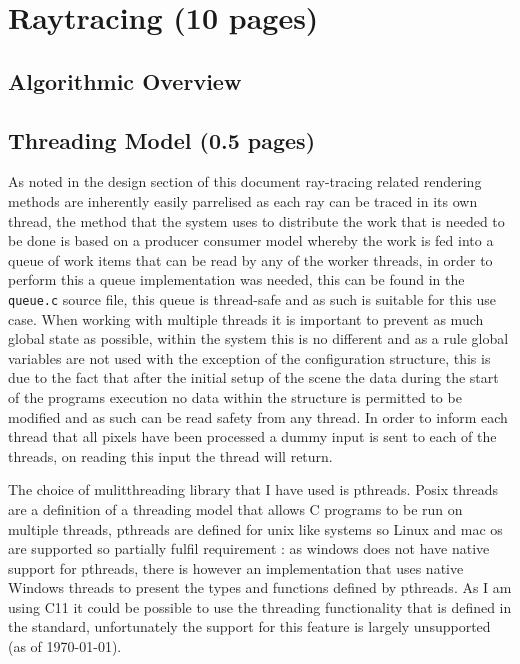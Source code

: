 \section{Raytracing (10 pages)}
%
%
%
%

\subsection{Algorithmic Overview}

\subsection{Threading Model (0.5 pages)}
As noted in the design section of this document ray-tracing related rendering methods are inherently easily parrelised as each
ray can be traced in its own thread, the method that the system uses to distribute the work that is needed to be done is
based on a producer consumer model whereby the work is fed into a queue of work items that can be read by any of the worker
threads, in order to perform this a queue implementation was needed, this can be found in the \texttt{queue.c} source file,
this queue is thread-safe and as such is suitable for this use case. When working with multiple threads it is important
to prevent as much global state as possible, within the system this is no different and as a rule global variables are not used
with the exception of the configuration structure, this is due to the fact that after the initial setup of the scene the data
during the start of the programs execution no data within the structure is permitted to be modified and as such can be read
safety from any thread. In order to inform each thread that all pixels have been processed a dummy input is sent to each of the
threads, on reading this input the thread will return.


The choice of mulitthreading library that I have used is pthreads. Posix threads are a definition
of a threading model that allows C programs to be run on multiple threads, pthreads are defined for unix like systems so
Linux and mac os are supported so partially fulfil requirement : as windows does not have native
support for pthreads, there is however an implementation that uses native Windows threads to present the types and functions defined
by pthreads. As I am using C11 it could be possible to use the threading functionality that is defined in the standard,
unfortunately the support for this feature is largely unsupported (as of \today).


